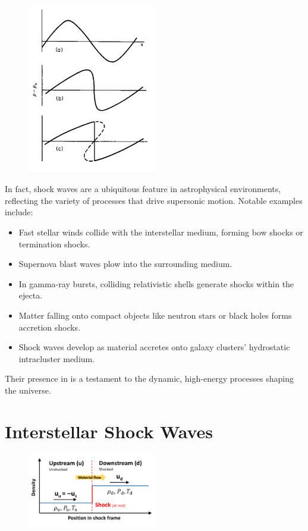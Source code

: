 \begin{figure}[!t]
\centering
\includegraphics[width=0.5\textwidth]{figures/shocklandau.pdf}
\caption{}
\label{fig:landau}
\end{figure}

In fact, shock waves are a ubiquitous feature in astrophysical environments, reflecting the variety of processes that drive supersonic motion. 
%
Notable examples include:
\begin{itemize}
\item Fast stellar winds collide with the interstellar medium, forming bow shocks or termination shocks.  
\item Supernova blast waves plow into the surrounding medium.  
\item In gamma-ray bursts, colliding relativistic shells generate shocks within the ejecta.  
\item Matter falling onto compact objects like neutron stars or black holes forms accretion shocks.  
\item Shock waves develop as material accretes onto galaxy clusters' hydrostatic intracluster medium.  
\end{itemize}

Their presence in is a testament to the dynamic, high-energy processes shaping the universe.



\section{Interstellar Shock Waves}

\begin{figure}[!t]
\centering
\includegraphics[width=0.5\textwidth]{figures/downupstream.pdf}
\caption{}
\end{figure}

